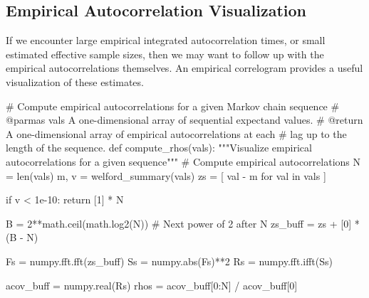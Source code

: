 \documentclass[
  letterpaper,
  DIV=11,
  numbers=noendperiod]{scrartcl}
\newenvironment{Shaded}{\begin{snugshade}}{\end{snugshade}}
\newcommand{\BuiltInTok}[1]{\textcolor[rgb]{0.00,0.23,0.31}{#1}}
\newcommand{\CommentTok}[1]{\textcolor[rgb]{0.37,0.37,0.37}{#1}}
\newcommand{\ControlFlowTok}[1]{\textcolor[rgb]{0.00,0.23,0.31}{#1}}
\newcommand{\DecValTok}[1]{\textcolor[rgb]{0.68,0.00,0.00}{#1}}
\newcommand{\FloatTok}[1]{\textcolor[rgb]{0.68,0.00,0.00}{#1}}
\newcommand{\KeywordTok}[1]{\textcolor[rgb]{0.00,0.23,0.31}{#1}}
\newcommand{\NormalTok}[1]{\textcolor[rgb]{0.00,0.23,0.31}{#1}}
\newcommand{\OperatorTok}[1]{\textcolor[rgb]{0.37,0.37,0.37}{#1}}
\begin{document}
\subsection{Empirical Autocorrelation
Visualization}\label{empirical-autocorrelation-visualization}

If we encounter large empirical integrated autocorrelation times, or
small estimated effective sample sizes, then we may want to follow up
with the empirical autocorrelations themselves. An empirical correlogram
provides a useful visualization of these estimates.

\begin{Shaded}
\begin{Highlighting}[]
\CommentTok{\# Compute empirical autocorrelations for a given Markov chain sequence}
\CommentTok{\# @parmas vals A one{-}dimensional array of sequential expectand values.}
\CommentTok{\# @return A one{-}dimensional array of empirical autocorrelations at each}
\CommentTok{\#         lag up to the length of the sequence.}
\KeywordTok{def}\NormalTok{ compute\_rhos(vals):}
  \CommentTok{"""Visualize empirical autocorrelations for a given sequence"""}
  \CommentTok{\# Compute empirical autocorrelations}
\NormalTok{  N }\OperatorTok{=} \BuiltInTok{len}\NormalTok{(vals)}
\NormalTok{  m, v }\OperatorTok{=}\NormalTok{ welford\_summary(vals)}
\NormalTok{  zs }\OperatorTok{=}\NormalTok{ [ val }\OperatorTok{{-}}\NormalTok{ m }\ControlFlowTok{for}\NormalTok{ val }\KeywordTok{in}\NormalTok{ vals ]}

  \ControlFlowTok{if}\NormalTok{ v }\OperatorTok{\textless{}} \FloatTok{1e{-}10}\NormalTok{:}
    \ControlFlowTok{return}\NormalTok{ [}\DecValTok{1}\NormalTok{] }\OperatorTok{*}\NormalTok{ N}

\NormalTok{  B }\OperatorTok{=} \DecValTok{2}\OperatorTok{**}\NormalTok{math.ceil(math.log2(N)) }\CommentTok{\# Next power of 2 after N}
\NormalTok{  zs\_buff }\OperatorTok{=}\NormalTok{ zs }\OperatorTok{+}\NormalTok{ [}\DecValTok{0}\NormalTok{] }\OperatorTok{*}\NormalTok{ (B }\OperatorTok{{-}}\NormalTok{ N)}

\NormalTok{  Fs }\OperatorTok{=}\NormalTok{ numpy.fft.fft(zs\_buff)}
\NormalTok{  Ss }\OperatorTok{=}\NormalTok{ numpy.}\BuiltInTok{abs}\NormalTok{(Fs)}\OperatorTok{**}\DecValTok{2}
\NormalTok{  Rs }\OperatorTok{=}\NormalTok{ numpy.fft.ifft(Ss)}

\NormalTok{  acov\_buff }\OperatorTok{=}\NormalTok{ numpy.real(Rs)}
\NormalTok{  rhos }\OperatorTok{=}\NormalTok{ acov\_buff[}\DecValTok{0}\NormalTok{:N] }\OperatorTok{/}\NormalTok{ acov\_buff[}\DecValTok{0}\NormalTok{]}


\end{Highlighting}
\end{Shaded}
\end{document}
